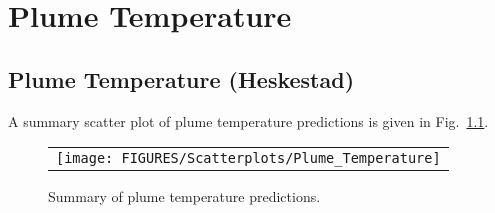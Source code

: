 \chapter{Plume Temperature}

\section{Plume Temperature (Heskestad)}

A summary scatter plot of plume temperature predictions is given in Fig.~\ref{plume_temperature_summary}. 

\begin{figure}[ht]
\begin{center}
\begin{tabular}{l}
\texttt{[image: FIGURES/Scatterplots/Plume\_Temperature]}
\end{tabular}
\end{center}
\caption[Summary of plume temperature predictions.]
{Summary of plume temperature predictions.}
\label{plume_temperature_summary}
\end{figure}


